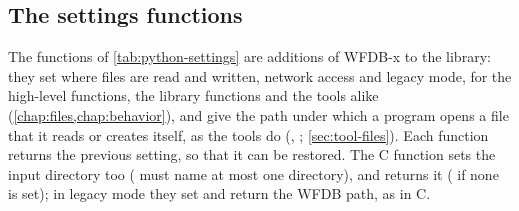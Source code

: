 \subsection{The settings functions}
\label{sec:python-settings}

The functions of \cref{tab:python-settings} are additions of WFDB-x to the library: they
set where files are read and written, network access and legacy mode, for the high-level
functions, the library functions and the tools alike (\cref{chap:files,chap:behavior}),
and give the path under which a program opens a file that it reads or creates itself, as
the tools do (, ;
\cref{sec:tool-files}). Each  function returns the previous setting, so that it
can be restored. The
C function  sets the input directory too ( must name at most one
directory), and  returns it ( if none is set); in legacy mode
they set and return the WFDB path, as in C.

